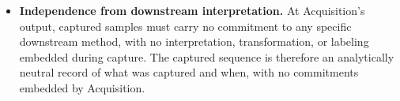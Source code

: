\begin{itemize}
    \item \textbf{Independence from downstream interpretation.} At Acquisition's output, captured samples must carry no commitment to any specific downstream method, with no interpretation, transformation, or labeling embedded during capture. The captured sequence is therefore an analytically neutral record of what was captured and when, with no commitments embedded by Acquisition.
  \end{itemize}

